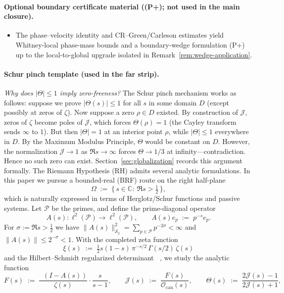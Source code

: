 \documentclass[11pt]{article}
\theoremstyle{definition}
\theoremstyle{remark}
\theoremstyle{definition}
\newcommand{\C}{\mathbb{C}}
\newcommand{\PP}{\mathcal{P}}
\newcommand{\HS}{\mathcal{S}_2}
\newcommand{\Half}{\{\,s\in\C:\ \Re s>\tfrac12\,\}}
\DeclareMathOperator{\dettwo}{det_2}
\begin{document}
\paragraph{Optional boundary certificate material (\textup{(P+)}; not used in the main closure).}
\begin{itemize}
\item The phase--velocity identity and CR--Green/Carleson estimates yield Whitney-local phase-mass bounds and a boundary-wedge formulation \textup{(P+)} up to the local-to-global upgrade isolated in Remark~\ref{rem:wedge-application}.
\end{itemize}

\paragraph{Schur pinch template (used in the far strip).}
\emph{Why does $|\Theta| \le 1$ imply zero-freeness?} The Schur pinch mechanism works as follows: suppose we prove $|\Theta(s)| \le 1$ for all $s$ in some domain $D$ (except possibly at zeros of $\zeta$). Now suppose a zero $\rho \in D$ existed. By construction of $\mathcal{J}$, zeros of $\zeta$ become poles of $\mathcal{J}$, which forces $\Theta(\rho) = 1$ (the Cayley transform sends $\infty$ to $1$). But then $|\Theta| = 1$ at an interior point $\rho$, while $|\Theta| \le 1$ everywhere in $D$. By the Maximum Modulus Principle, $\Theta$ would be constant on $D$. However, the normalization $\mathcal{J} \to 1$ as $\Re s \to \infty$ forces $\Theta \to 1/3$ at infinity---contradiction. Hence no such zero can exist. Section~\ref{sec:globalization} records this argument formally.
The Riemann Hypothesis (RH) admits several analytic formulations. In this paper we pursue a bounded-real (BRF) route on the right half-plane
\[
 \Omega\;:=\;\Half,
\]
which is naturally expressed in terms of Herglotz/Schur functions and passive systems. Let \(\PP\) be the primes, and define the prime-diagonal operator
\[
 A(s):\ell^2(\PP)\to\ell^2(\PP),\qquad A(s)e_p\;:=\;p^{-s}e_p.
\]
For \(\sigma:=\Re s>\tfrac12\) we have \(\|A(s)\|_{\HS}^2=\sum_{p\in\PP}p^{-2\sigma}<\infty\) and \(\|A(s)\|\le 2^{-\sigma}<1\). With the completed zeta function
\[
 \xi(s)\;:=\;\tfrac12 s(1-s)\,\pi^{-s/2}\,\Gamma(s/2)\,\zeta(s)
\]
and the Hilbert--Schmidt regularized determinant \(\dettwo\), we study the analytic function
\[
 F(s)\;:=\;\frac{\dettwo(I-A(s))}{\zeta(s)}\cdot\frac{s}{s-1},
 \qquad
 \mathcal J(s)\;:=\;\frac{F(s)}{\mathcal O_{\mathrm{can}}(s)},
 \qquad
 \Theta(s)\;:=\;\frac{2\mathcal J(s)-1}{2\mathcal J(s)+1},
\]
\end{document}
